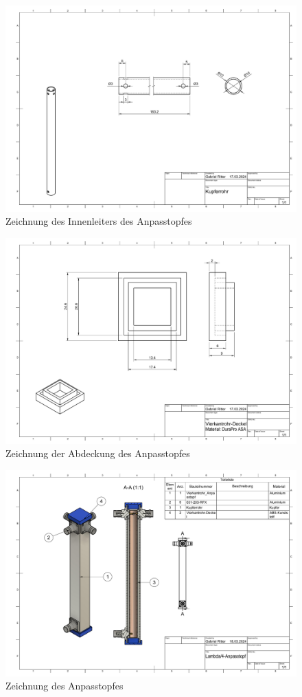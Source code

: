 \begin{figure}[h!]
	\includegraphics[angle=90,width=\textwidth]{../ref/Anpasstopf-Innenleiter.pdf}
	\caption{Zeichnung des Innenleiters des Anpasstopfes}
	\label{fig:Zeichnung-anpasstopf-innenleiter}
\end{figure}

\begin{figure}[h!]
	\includegraphics[angle=90,width=\textwidth]{../ref/Vierkantrohr-Deckel Zeichnung v4.pdf}
	\caption{Zeichnung der Abdeckung des Anpasstopfes}
	\label{fig:Zeichnung-anpasstopf-Abdeckung}
\end{figure}

\begin{figure}[h!]
	\includegraphics[angle=90,width=\textwidth]{../ref/Lambda_4-Anpasstopf Zeichnung v0.pdf}
	\caption{Zeichnung des Anpasstopfes}
	\label{fig:Zeichnung-anpasstopf}
\end{figure}
